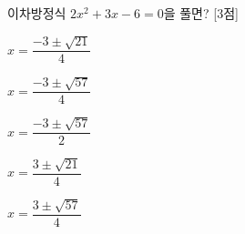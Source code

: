 이차방정식 $2x^2+3x-6=0$을 풀면? \mbox{[3점]}
\begin{choicesii}{\rule[-3ex]{0pt}{8ex}$x=\dfrac{-3\pm\sqrt{21}}{4}$}{\rule[-3ex]{0pt}{8ex}$x=\dfrac{-3\pm\sqrt{57}}{4}$}{\rule[-3ex]{0pt}{8ex}$x=\dfrac{-3\pm\sqrt{57}}{2}$}{\rule[-3ex]{0pt}{8ex}$x=\dfrac{3\pm\sqrt{21}}{4}$}{\rule[-3ex]{0pt}{8ex}$x=\dfrac{3\pm\sqrt{57}}{4}$}\end{choicesii}
